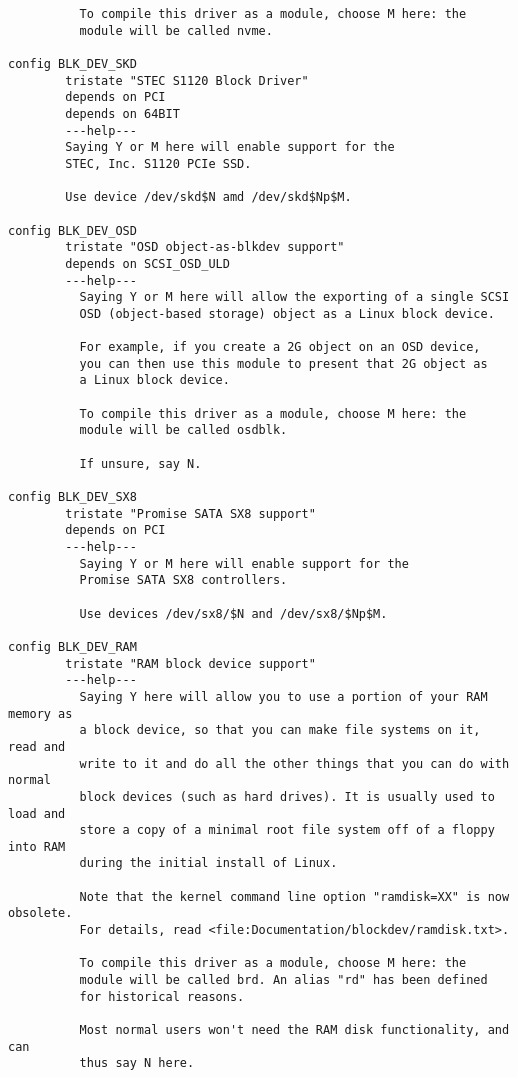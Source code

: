 \documentclass[journal,10pt,onecolumn,compsoc,letterpaper,draftclsnofoot,table,xcdraw]{IEEEtran} \usepackage[margin=0.75in]{geometry}
\begin{document}
\begin{verbatim}
          To compile this driver as a module, choose M here: the
          module will be called nvme.

config BLK_DEV_SKD
        tristate "STEC S1120 Block Driver"
        depends on PCI
        depends on 64BIT
        ---help---
        Saying Y or M here will enable support for the
        STEC, Inc. S1120 PCIe SSD.

        Use device /dev/skd$N amd /dev/skd$Np$M.

config BLK_DEV_OSD
        tristate "OSD object-as-blkdev support"
        depends on SCSI_OSD_ULD
        ---help---
          Saying Y or M here will allow the exporting of a single SCSI
          OSD (object-based storage) object as a Linux block device.

          For example, if you create a 2G object on an OSD device,
          you can then use this module to present that 2G object as
          a Linux block device.

          To compile this driver as a module, choose M here: the
          module will be called osdblk.

          If unsure, say N.

config BLK_DEV_SX8
        tristate "Promise SATA SX8 support"
        depends on PCI
        ---help---
          Saying Y or M here will enable support for the
          Promise SATA SX8 controllers.

          Use devices /dev/sx8/$N and /dev/sx8/$Np$M.

config BLK_DEV_RAM
        tristate "RAM block device support"
        ---help---
          Saying Y here will allow you to use a portion of your RAM memory as
          a block device, so that you can make file systems on it, read and
          write to it and do all the other things that you can do with normal
          block devices (such as hard drives). It is usually used to load and
          store a copy of a minimal root file system off of a floppy into RAM
          during the initial install of Linux.

          Note that the kernel command line option "ramdisk=XX" is now obsolete.
          For details, read <file:Documentation/blockdev/ramdisk.txt>.

          To compile this driver as a module, choose M here: the
          module will be called brd. An alias "rd" has been defined
          for historical reasons.

          Most normal users won't need the RAM disk functionality, and can
          thus say N here.


\end{verbatim}
\end{document}
